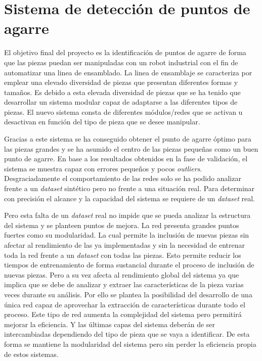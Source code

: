 \section{Sistema de detección de puntos de agarre}
\label{chap:Conclusiones sec:Sistema de detección de puntos de agarre}
El objetivo final del proyecto es la identificación de puntos de agarre de forma que las piezas puedan ser manipuladas con un robot industrial con el fin de automatizar una linea de ensamblado. La linea de ensamblaje se caracteriza por emplear una elevado diversidad de piezas que presentan diferentes formas y tamaños. Es debido a esta elevada diversidad de piezas que se ha tenido que desarrollar un sistema modular capaz de adaptarse a las diferentes tipos de piezas. El nuevo sistema consta de diferentes módulos/redes que se activan u desactivan en función del tipo de pieza que se desee manipular.

Gracias a este sistema se ha conseguido obtener el punto de agarre óptimo para las piezas grandes y se ha asumido el centro de las piezas pequeñas como un buen punto de agarre. En base a los resultados obtenidos en la fase de validación, el sistema se muestra capaz con errores pequeños y pocos \textit{outliers}. Desgraciadamente el comportamiento de las redes solo se ha podido analizar frente a un \textit{dataset} sintético pero no frente a una situación real. Para determinar con precisión el alcance y la capacidad del sistema se requiere de un \textit{dataset} real.

Pero esta falta de un \textit{dataset} real no impide que se pueda analizar la estructura del sistema y se planteen puntos de mejora. La red presenta grandes puntos fuertes como su modularidad. La cual permite la inclusión de nuevas piezas sin afectar al rendimiento de las ya implementadas y sin la necesidad de entrenar toda la red frente a un \textit{dataset} con todas las piezas. Esto permite reducir los tiempos de entrenamiento de forma sustancial durante el proceso de inclusión de nuevas piezas. Pero a su vez afecta al rendimiento global del sistema ya que implica que se debe de analizar y extraer las características de la pieza varias veces durante su análisis. Por ello se plantea la posibilidad del desarrollo de una única red capaz de aprovechar la extracción de características durante todo el proceso. Este tipo de red aumenta la complejidad del sistema pero permitirá mejorar la eficiencia. Y las últimas capas del sistema deberán de ser intercambiadas dependiendo del tipo de pieza que se vaya a identificar. De esta forma se mantiene la modularidad del sistema pero sin perder la eficiencia propia de estos sistemas.


